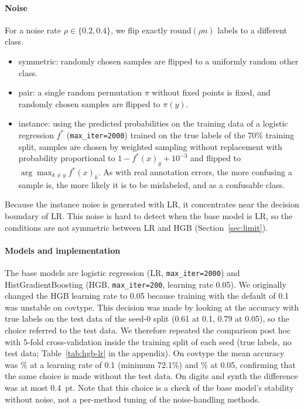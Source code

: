 \documentclass[a4paper,10pt]{article}
\begin{document}
\paragraph{Noise}
For a noise rate $\rho \in \{0.2, 0.4\}$, we flip exactly $\mathrm{round}(\rho n)$ labels to a different class.
\begin{itemize}
  \item symmetric: randomly chosen samples are flipped to a uniformly random other class.
  \item pair: a single random permutation $\pi$ without fixed points is fixed, and randomly chosen samples are flipped to $\pi(y)$.
  \item instance: using the predicted probabilities on the training data of a logistic regression $f^*$ (\texttt{max\_iter=2000}) trained on the true labels of the 70\% training split, samples are chosen by weighted sampling without replacement with probability proportional to $1 - f^*(x)_y + 10^{-3}$ and flipped to $\arg\max_{k \neq y} f^*(x)_k$. As with real annotation errors, the more confusing a sample is, the more likely it is to be mislabeled, and as a confusable class.
\end{itemize}
Because the instance noise is generated with LR, it concentrates near the decision boundary of LR.
This noise is hard to detect when the base model is LR, so the conditions are not symmetric between LR and HGB (Section~\ref{sec:limit}).

\paragraph{Models and implementation}
The base models are logistic regression (LR, \texttt{max\_iter=2000}) and HistGradientBoosting (HGB, \texttt{max\_iter=200}, learning rate 0.05).
We originally changed the HGB learning rate to 0.05 because training with the default of 0.1 was unstable on covtype.
This decision was made by looking at the accuracy with true labels on the test data of the seed-0 split (0.61 at 0.1, 0.79 at 0.05), so the choice referred to the test data.
We therefore repeated the comparison post hoc with 5-fold cross-validation inside the training split of each seed (true labels, no test data; Table~\ref{tab:hgb-lr} in the appendix).
On covtype the mean accuracy was \CovLRHigh\% at a learning rate of 0.1 (minimum 72.1\%) and \CovLRLow\% at 0.05, confirming that the same choice is made without the test data.
On digits and synth the difference was at most 0.4~pt.
Note that this choice is a check of the base model's stability without noise, not a per-method tuning of the noise-handling methods.
\end{document}
